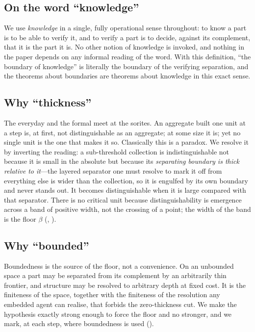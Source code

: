 \documentclass[11pt,a4paper]{article}
\theoremstyle{thmstyle}
\theoremstyle{definition}
\theoremstyle{remark}
\newcommand{\thick}{\beta}
\begin{document}
\subsection{On the word ``knowledge''}

We use \emph{knowledge} in a single, fully operational sense throughout: to
know a part is to be able to verify it, and to verify a part is to decide,
against its complement, that it is the part it is. No other notion of
knowledge is invoked, and nothing in the paper depends on any informal
reading of the word. With this definition, ``the boundary of knowledge'' is
literally the boundary of the verifying separation, and the theorems about
boundaries are theorems about knowledge in this exact sense.

\subsection{Why ``thickness''}

The everyday and the formal meet at the sorites. An aggregate built one unit
at a step is, at first, not distinguishable as an aggregate; at some size it
is; yet no single unit is the one that makes it so. Classically this is a
paradox. We resolve it by inverting the reading: a sub-threshold collection is
indistinguishable not because it is small in the absolute but because its
\emph{separating boundary is thick relative to it}---the layered separator one
must resolve to mark it off from everything else is wider than the collection,
so it is engulfed by its own boundary and never stands out. It becomes
distinguishable when it is large compared with that separator. There is no
critical unit because distinguishability is emergence across a band of
positive width, not the crossing of a point; the width of the band is the
floor $\thick$ (, ).

\subsection{Why ``bounded''}

Boundedness is the source of the floor, not a convenience. On an unbounded
space a part may be separated from its complement by an arbitrarily thin
frontier, and structure may be resolved to arbitrary depth at fixed cost. It
is the finiteness of the space, together with the finiteness of the resolution
any embedded agent can realise, that forbids the zero-thickness cut. We make
the hypothesis exactly strong enough to force the floor and no stronger, and
we mark, at each step, where boundedness is used ().
\end{document}
